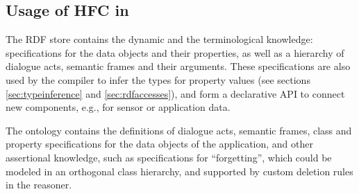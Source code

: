 \subsection{Usage of HFC in \vonda} \label{hfc_usage}

The RDF store contains the dynamic and the terminological knowledge:
specifications for the data objects and their properties, as well as a
hierarchy of  dialogue acts,  semantic frames and their arguments. These
specifications are also used by the compiler to infer the types for property
values (see sections \ref{sec:typeinference} and \ref{sec:rdfaccesses}), and form a declarative API to
connect new components, e.g., for sensor or application data.

The ontology contains the definitions of dialogue acts, semantic frames, class
and property specifications for the data objects of the application, and other
assertional knowledge, such as specifications for ``forgetting'', which could
be modeled in an orthogonal class hierarchy, and supported by custom deletion
rules in the reasoner.

